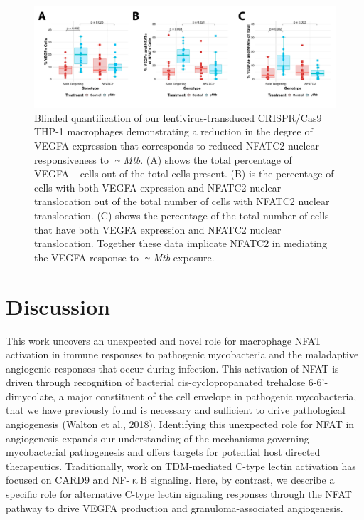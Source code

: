 \begin{figure}
\centering
\includegraphics[width=\textwidth]{images/lentiIFquant.pdf}
\caption{Blinded quantification of our lentivirus\hyp{}transduced CRISPR/Cas9 THP\hyp{}1 macrophages demonstrating a reduction in the degree of VEGFA expression that corresponds to reduced NFATC2 nuclear responsiveness to $\upgamma$\textit{Mtb}. (A) shows the total percentage of VEGFA+ cells out of the total cells present. (B) is the percentage of cells with both VEGFA expression and NFATC2 nuclear translocation out of the total number of cells with NFATC2 nuclear translocation. (C) shows the percentage of the total number of cells that have both VEGFA expression and NFATC2 nuclear translocation. Together these data implicate NFATC2 in mediating the VEGFA response to $\upgamma$\textit{Mtb} exposure.}
\label{figure:lentiIFquant}
\end{figure}

\section{Discussion}\label{pap:disc}

This work uncovers an unexpected and novel role for macrophage NFAT activation in immune responses to pathogenic mycobacteria and the maladaptive angiogenic responses that occur during infection. This activation of NFAT is driven through recognition of bacterial cis\hyp{}cyclopropanated trehalose 6\hyp{}6'\hyp{}dimycolate, a major constituent of the cell envelope in pathogenic mycobacteria, that we have previously found is necessary and sufficient to drive pathological angiogenesis (Walton et al., 2018). Identifying this unexpected role for NFAT in angiogenesis expands our understanding of the mechanisms governing mycobacterial pathogenesis and offers targets for potential host directed therapeutics. Traditionally, work on TDM\hyp{}mediated C\hyp{}type lectin activation has focused on CARD9 and NF\hyp{}$\upkappa$B signaling. Here, by contrast, we describe a specific role for alternative C\hyp{}type lectin signaling responses through the NFAT pathway to drive VEGFA production and granuloma\hyp{}associated angiogenesis. 

